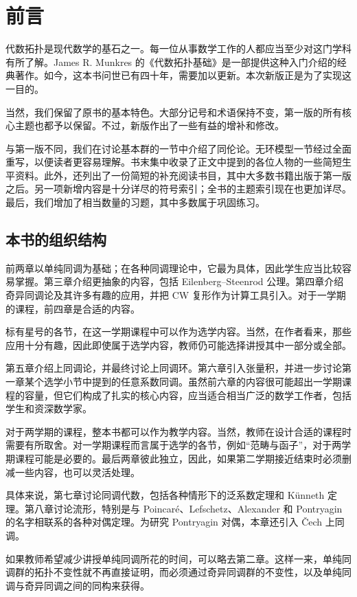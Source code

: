 \chapter*{前言}
代数拓扑是现代数学的基石之一。每一位从事数学工作的人都应当至少对这门学科有所了解。James R. Munkres 的《代数拓扑基础》是一部提供这种入门介绍的经典著作。如今，这本书问世已有四十年，需要加以更新。本次新版正是为了实现这一目的。

当然，我们保留了原书的基本特色。大部分记号和术语保持不变，第一版的所有核心主题也都予以保留。不过，新版作出了一些有益的增补和修改。

与第一版不同，我们在讨论基本群的一节中介绍了同伦论。无环模型一节经过全面重写，以便读者更容易理解。书末集中收录了正文中提到的各位人物的一些简短生平资料。此外，还列出了一份简短的补充阅读书目，其中大多数书籍出版于第一版之后。另一项新增内容是十分详尽的符号索引；全书的主题索引现在也更加详尽。最后，我们增加了相当数量的习题，其中多数属于巩固练习。

\section*{本书的组织结构}
前两章以单纯同调为基础；在各种同调理论中，它最为具体，因此学生应当比较容易掌握。第三章介绍更抽象的内容，包括 Eilenberg--Steenrod 公理。第四章介绍奇异同调论及其许多有趣的应用，并把 CW 复形作为计算工具引入。对于一学期的课程，前四章是合适的内容。

标有星号的各节，在这一学期课程中可以作为选学内容。当然，在作者看来，那些应用十分有趣，因此即使属于选学内容，教师仍可能选择讲授其中一部分或全部。

第五章介绍上同调论，并最终讨论上同调环。第六章引入张量积，并进一步讨论第一章某个选学小节中提到的任意系数同调。虽然前六章的内容很可能超出一学期课程的容量，但它们构成了扎实的核心内容，应当适合相当广泛的数学工作者，包括学生和资深数学家。

对于两学期的课程，整本书都可以作为教学内容。当然，教师在设计合适的课程时需要有所取舍。对一学期课程而言属于选学的各节，例如“范畴与函子”，对于两学期课程可能是必要的。最后两章彼此独立，因此，如果第二学期接近结束时必须删减一些内容，也可以灵活处理。

具体来说，第七章讨论同调代数，包括各种情形下的泛系数定理和 Künneth 定理。第八章讨论流形，特别是与 Poincaré、Lefschetz、Alexander 和 Pontryagin 的名字相联系的各种对偶定理。为研究 Pontryagin 对偶，本章还引入 Čech 上同调。

如果教师希望减少讲授单纯同调所花的时间，可以略去第二章。这样一来，单纯同调群的拓扑不变性就不再直接证明，而必须通过奇异同调群的不变性，以及单纯同调与奇异同调之间的同构来获得。

